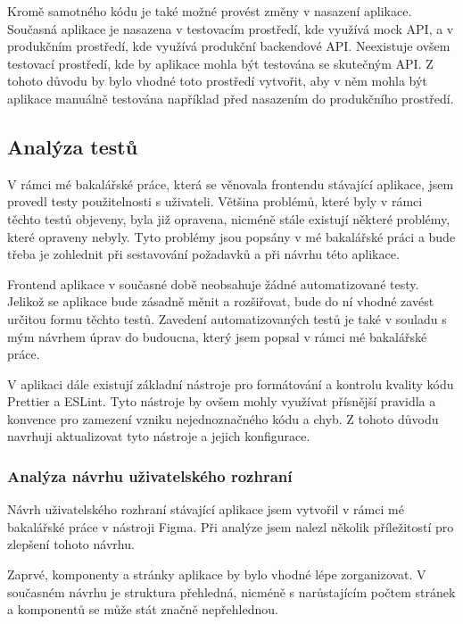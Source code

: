 Kromě samotného kódu je také možné provést změny v nasazení aplikace. Současná aplikace je nasazena v testovacím prostředí, kde využívá mock API, a v produkčním prostředí, kde využívá produkční backendové API. Neexistuje ovšem testovací prostředí, kde by aplikace mohla být testována se skutečným API. Z tohoto důvodu by bylo vhodné toto prostředí vytvořit, aby v něm mohla být aplikace manuálně testována například před nasazením do produkčního prostředí.

\subsection{Analýza testů}

V rámci mé bakalářské práce, která se věnovala frontendu stávající aplikace, jsem provedl testy použitelnosti s uživateli. Většina problémů, které byly v rámci těchto testů objeveny, byla již opravena, nicméně stále existují některé problémy, které opraveny nebyly. Tyto problémy jsou popsány v mé bakalářské práci a bude třeba je zohlednit při sestavování požadavků a při návrhu této aplikace. \cite{Jenicek2024BachelorThesis}

Frontend aplikace v současné době neobsahuje žádné automatizované testy. Jelikož se aplikace bude zásadně měnit a rozšiřovat, bude do ní vhodné zavést určitou formu těchto testů. Zavedení automatizovaných testů je také v souladu s mým návrhem úprav do budoucna, který jsem popsal v rámci mé bakalářské práce. \cite{Jenicek2024BachelorThesis}

V aplikaci dále existují základní nástroje pro formátování a kontrolu kvality kódu Prettier a ESLint. Tyto nástroje by ovšem mohly využívat přísnější pravidla a konvence pro zamezení vzniku nejednoznačného kódu a chyb. Z tohoto důvodu navrhuji aktualizovat tyto nástroje a jejich konfigurace.

\subsubsection{Analýza návrhu uživatelského rozhraní}

Návrh uživatelského rozhraní stávající aplikace jsem vytvořil v rámci mé bakalářské práce v nástroji Figma. Při analýze jsem nalezl několik příležitostí pro zlepšení tohoto návrhu.

Zaprvé, komponenty a stránky aplikace by bylo vhodné lépe zorganizovat. V současném návrhu je struktura přehledná, nicméně s narůstajícím počtem stránek a komponentů se může stát značně nepřehlednou.

